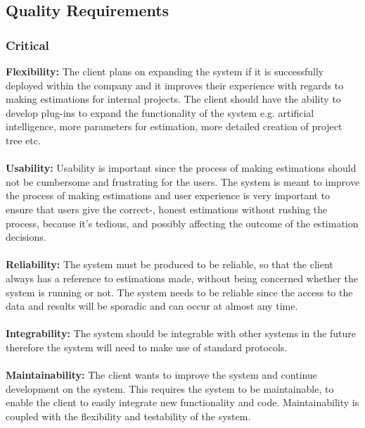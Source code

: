 \subsection{Quality Requirements}
\subsubsection{Critical}
	{\bfseries Flexibility:}
	The client plans on expanding the system if it is successfully deployed within the company and it improves their experience with regards to making estimations for internal projects. The client should have the ability to develop plug-ins to expand the functionality of the system e.g. artificial intelligence, more parameters for estimation, more detailed creation of project tree etc.
	\\ \\
	{\bfseries Usability:}
	Usability is important since the process of making estimations should not be cumbersome and frustrating for the users. The system is meant to improve the process of making estimations and user experience is very important to ensure that users give the correct-, honest estimations without rushing the process, because it's tedious, and possibly affecting the outcome of the estimation decisions.
	\\ \\
	{\bfseries Reliability:}
	The system must be produced to be reliable, so that the client always has a reference to estimations made, without being concerned whether the system is running or not. The system needs to be reliable since the access to the data and results will be sporadic and can occur at almost any time.
	\\ \\
	{\bfseries Integrability:}
	The system should be integrable with other systems in the future therefore the system will need to make use of standard protocols.
	\\ \\
	{\bfseries Maintainability:}
	The client wants to improve the system and continue development on the system. This requires the system to be maintainable, to enable the client to easily integrate new functionality and code. Maintainability is coupled with the flexibility and testability of the system.
